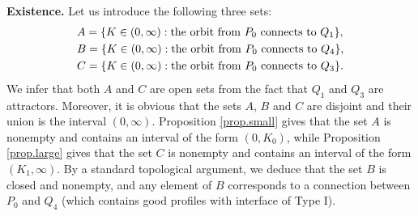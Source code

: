 \documentclass[a4paper,11pt]{article}
\numberwithin{equation}{section}
\begin{document}
\noindent \textbf{Existence.} Let us introduce the following three sets:
\begin{equation*}
\begin{split}
&A=\{K\in(0,\infty):{\rm the \ orbit \ from} \ P_0 \ {\rm connects \ to} \ Q_1\}, \\
&B=\{K\in(0,\infty):{\rm the \ orbit \ from} \ P_0 \ {\rm connects \ to} \ Q_4\}, \\
&C=\{K\in(0,\infty):{\rm the \ orbit \ from} \ P_0 \ {\rm connects \ to} \ Q_3\}.
\end{split}
\end{equation*}
We infer that both $A$ and $C$ are open sets from the fact that $Q_1$ and $Q_3$ are attractors. Moreover, it is obvious that the sets $A$, $B$ and $C$ are disjoint and their union is the interval $(0,\infty)$. Proposition \ref{prop.small} gives that the set $A$ is nonempty and contains an interval of the form $(0,K_0)$, while Proposition \ref{prop.large} gives that the set $C$ is nonempty and contains an interval of the form $(K_1,\infty)$. By a standard topological argument, we deduce that the set $B$ is closed and nonempty, and any element of $B$ corresponds to a connection between $P_0$ and $Q_4$ (which contains good profiles with interface of Type I).

\medskip
\end{document}
